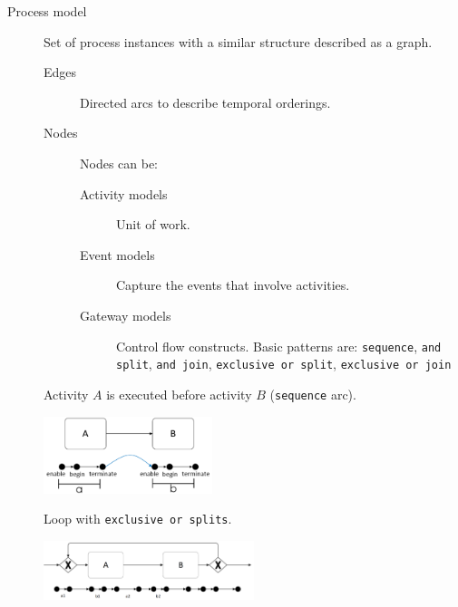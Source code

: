 \begin{description}
    \item[Process model]
        Set of process instances with a similar structure described as a graph.

        \begin{description}
            \item[Edges] Directed arcs to describe temporal orderings.
            
            \item[Nodes] Nodes can be:
                \begin{description}
                    \item[Activity models]  
                        Unit of work.
                    \item[Event models]  
                        Capture the events that involve activities.
                    \item[Gateway models]  
                        Control flow constructs.
                        Basic patterns are: \texttt{sequence}, \texttt{and split}, \texttt{and join}, \texttt{exclusive or split}, \texttt{exclusive or join}
                \end{description}
        \end{description}

        \begin{example}
            Activity $A$ is executed before activity $B$ (\texttt{sequence} arc).
            \begin{center}
                \includegraphics[width=0.4\textwidth]{img/bp_control_flow_sequence.png}
            \end{center}
        \end{example}

        \begin{example}
            Loop with \texttt{exclusive or splits}.
            \begin{center}
                \includegraphics[width=0.5\textwidth]{img/bp_control_flow_loop.png}
            \end{center}
        \end{example}


\end{description}
